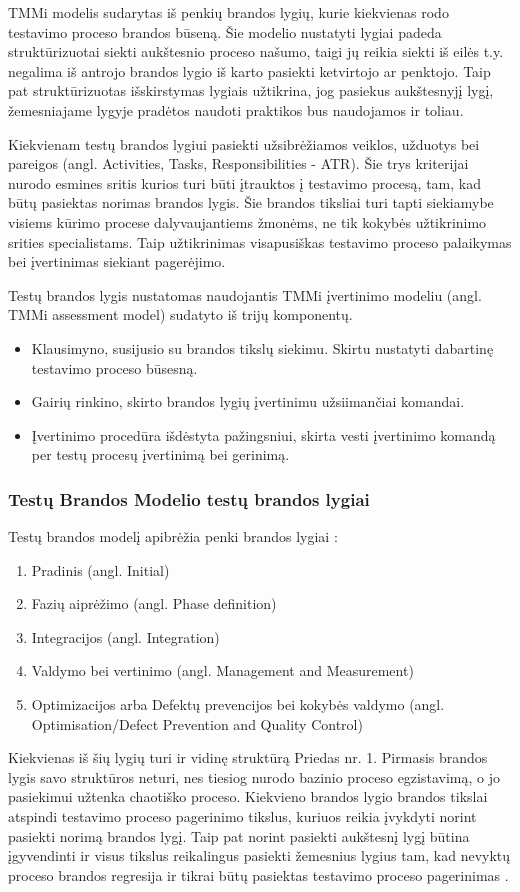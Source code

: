 \documentclass{VUMIFPSkursinis}
\begin{document}
TMMi modelis sudarytas iš penkių brandos lygių, kurie kiekvienas rodo testavimo proceso brandos būseną. Šie modelio nustatyti lygiai padeda struktūrizuotai siekti aukštesnio proceso našumo, taigi jų reikia siekti iš eilės t.y. negalima iš antrojo brandos lygio iš karto pasiekti ketvirtojo ar penktojo. Taip pat struktūrizuotas išskirstymas lygiais užtikrina, jog pasiekus aukštesnyjį lygį, žemesniajame lygyje pradėtos naudoti praktikos bus naudojamos ir toliau.

Kiekvienam testų brandos lygiui pasiekti užsibrėžiamos veiklos, užduotys bei pareigos (angl. Activities, Tasks, Responsibilities - ATR). Šie trys kriterijai nurodo esmines sritis kurios turi būti įtrauktos į testavimo procesą, tam, kad būtų pasiektas norimas brandos lygis. Šie brandos tiksliai turi tapti siekiamybe visiems kūrimo procese dalyvaujantiems žmonėms, ne tik kokybės užtikrinimo srities specialistams. Taip užtikrinimas visapusiškas testavimo proceso palaikymas bei įvertinimas siekiant pagerėjimo.

Testų brandos lygis nustatomas naudojantis TMMi įvertinimo modeliu (angl. TMMi assessment model) sudatyto iš trijų komponentų.
\begin{itemize}
   \item Klausimyno, susijusio su brandos tikslų siekimu. Skirtu nustatyti dabartinę testavimo proceso būsesną.
   \item Gairių rinkino, skirto brandos lygių įvertinimu užsiimančiai komandai.
   \item Įvertinimo procedūra išdėstyta pažingsniui, skirta vesti įvertinimo komandą per testų procesų įvertinimą bei gerinimą.
\end{itemize}

\subsubsection{Testų Brandos Modelio testų brandos lygiai}
Testų brandos modelį apibrėžia penki brandos lygiai \cite{Burnstein:2010:PST:1965566}:
\begin{enumerate}
   \item Pradinis (angl. Initial)
   \item Fazių aiprėžimo (angl. Phase definition)
   \item Integracijos (angl. Integration)
   \item Valdymo bei vertinimo (angl. Management and Measurement)
   \item Optimizacijos arba Defektų prevencijos bei kokybės valdymo (angl. Optimisation/Defect Prevention and Quality Control)
\end{enumerate}
Kiekvienas iš šių lygių turi ir vidinę struktūrą Priedas nr. 1. Pirmasis brandos lygis savo struktūros neturi, nes tiesiog nurodo bazinio proceso egzistavimą, o jo pasiekimui užtenka chaotiško proceso. Kiekvieno brandos lygio brandos tikslai atspindi testavimo proceso pagerinimo tikslus, kuriuos reikia įvykdyti norint pasiekti norimą brandos lygį. Taip pat norint pasiekti aukštesnį lygį būtina įgyvendinti ir visus tikslus reikalingus pasiekti žemesnius lygius tam, kad nevyktų proceso brandos regresija ir tikrai būtų pasiektas testavimo proceso pagerinimas \cite{Tmmi}.
\end{document}
